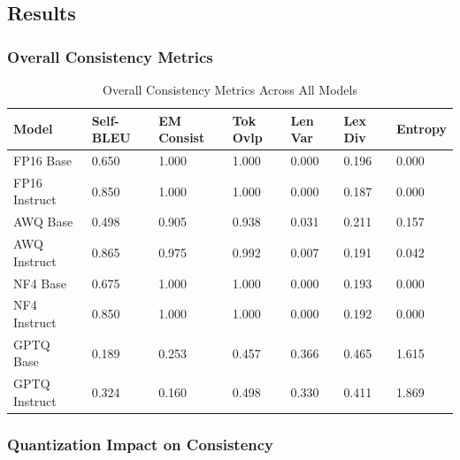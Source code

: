 \documentclass[11pt,a4paper]{article}
\begin{document}
\subsection{Results}

\subsubsection{Overall Consistency Metrics}

\begin{table}[H]
\centering
\caption{Overall Consistency Metrics Across All Models}
\small
\begin{tabularx}{\textwidth}{@{}X C{1.5cm} C{1.5cm} C{1.5cm} C{1.5cm} C{1.5cm} C{1.5cm}@{}}
\toprule
\textbf{Model} & \textbf{Self-BLEU} & \textbf{EM Consist} & \textbf{Tok Ovlp} & \textbf{Len Var} & \textbf{Lex Div} & \textbf{Entropy} \\
\midrule
FP16 Base & 0.650 & 1.000 & 1.000 & 0.000 & 0.196 & 0.000 \\
FP16 Instruct & 0.850 & 1.000 & 1.000 & 0.000 & 0.187 & 0.000 \\
AWQ Base & 0.498 & 0.905 & 0.938 & 0.031 & 0.211 & 0.157 \\
AWQ Instruct & 0.865 & 0.975 & 0.992 & 0.007 & 0.191 & 0.042 \\
NF4 Base & 0.675 & 1.000 & 1.000 & 0.000 & 0.193 & 0.000 \\
NF4 Instruct & 0.850 & 1.000 & 1.000 & 0.000 & 0.192 & 0.000 \\
GPTQ Base & 0.189 & 0.253 & 0.457 & 0.366 & 0.465 & 1.615 \\
GPTQ Instruct & 0.324 & 0.160 & 0.498 & 0.330 & 0.411 & 1.869 \\
\bottomrule
\end{tabularx}
\end{table}

\subsubsection{Quantization Impact on Consistency}
\end{document}
